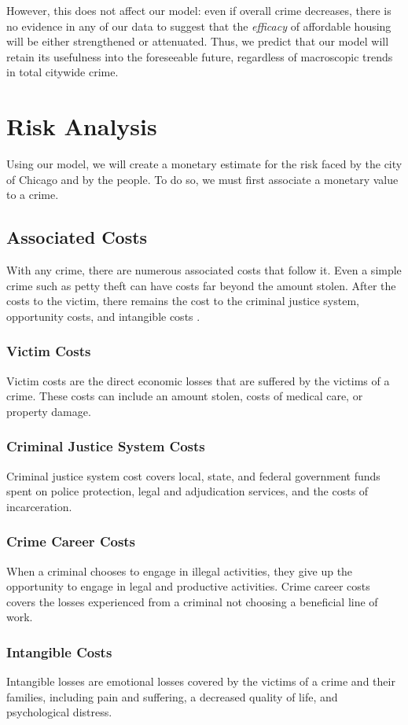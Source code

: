 \documentclass{article}
\begin{document}
\begin{onehalfspacing}
However, this does not affect our model: even if overall crime decreases, there is no evidence in any of our data to suggest that the \emph{efficacy} of affordable housing will be either strengthened or attenuated. Thus, we predict that our model will retain its usefulness into the foreseeable future, regardless of macroscopic trends in total citywide crime.

\section{Risk Analysis}
Using our model, we will create a monetary estimate for the risk faced by the city of Chicago and by the people. To do so, we must first associate a monetary value to a crime.
\subsection{Associated Costs}
With any crime, there are numerous associated costs that follow it. Even a simple crime such as petty theft can have costs far beyond the amount stolen. After the costs to the victim, there remains the cost to the criminal justice system, opportunity costs, and intangible costs \cite{costs}.
\subsubsection{Victim Costs}
Victim costs are the direct economic losses that are suffered by the victims of a crime. These costs can include an amount stolen, costs of medical care, or property damage.
\subsubsection{Criminal Justice System Costs}
Criminal justice system cost covers local, state, and federal government funds spent on police protection, legal and adjudication services, and the costs of incarceration.
\subsubsection{Crime Career Costs}
When a criminal chooses to engage in illegal activities, they give up the opportunity to engage in legal and productive activities. Crime career costs covers the losses experienced from a criminal not choosing a beneficial line of work.
\subsubsection{Intangible Costs}
Intangible losses are emotional losses covered by the victims of a crime and their families, including pain and suffering, a decreased quality of life, and psychological distress.

\end{onehalfspacing}
\end{document}
